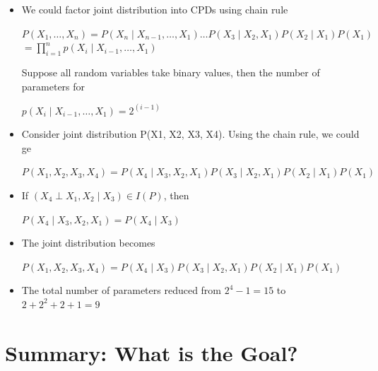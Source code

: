 \documentclass[11pt,a4paper]{report}
\begin{document}
\begin{itemize}
    \item We could factor joint distribution into CPDs using chain rule

\begin{center}
    $P(X_{1},\ldots, X_{n}) = P(X_{n} \mid X_{n-1}, \ldots, X_{1}) \dots P(X_{3} \mid X_{2},X_{1})P(X_{2} \mid X_{1})P(X_{1})$\\
    $ = \prod_{i=1}^{n} p(X_{i} \mid X_{i-1}, \ldots, X_{1})$
\end{center}

Suppose all random variables take binary values, then the number of parameters for 
\begin{center}
    $p(X_{i} \mid X_{i-1}, \ldots, X_{1}) = 2^{(i-1)}$
\end{center}

\item Consider joint distribution P(X1, X2, X3, X4). Using the chain rule, we could ge
\begin{center}
    $P(X_{1}, X_{2}, X_{3}, X_{4}) = P(X_{4} \mid X_{3}, X_{2}, X_{1}) P(X_{3} \mid X_{2}, X_{1})P(X_{2} \mid X_{1})P(X_{1})$
\end{center}
\item If $(X_{4} \perp X_{1}, X_{2} \mid X_{3}) \in I(P)$, then
\begin{center}
    $P(X_{4} \mid X_{3}, X_{2}, X_{1}) = P(X_{4} \mid X_{3})$
\end{center}
\item The joint distribution becomes
\begin{center}
    $P(X_{1}, X_{2}, X_{3}, X_{4}) = P(X_{4} \mid X_{3}) P(X_{3} \mid X_{2}, X_{1})P(X_{2} \mid X_{1})P(X_{1})$
\end{center}
\item The total number of parameters reduced from $2^4 - 1 = 15$ to $2 + 2^2 + 2 + 1 = 9$
\end{itemize}

\section{Summary: What is the Goal?}
\end{document}
